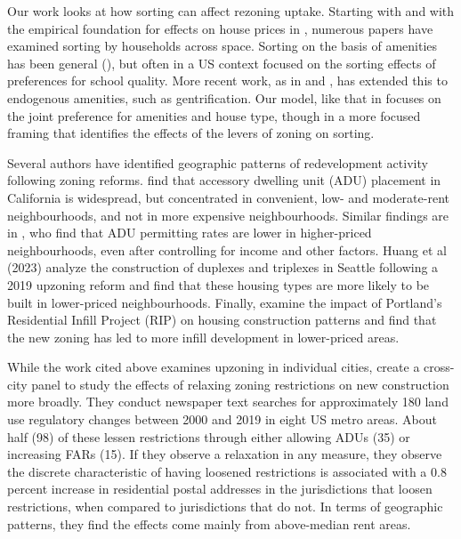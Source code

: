 \documentclass[12pt]{article}
\begin{document}
Our work looks at how sorting can affect rezoning uptake. Starting with \textcite{Tiebout1956} and with the empirical foundation for effects on house prices in \textcite{Rosen1974}, numerous papers have examined sorting by households across space. Sorting on the basis of amenities has been general (\textcite{Bayer_etal2004}), but often in a US context focused on the sorting effects of preferences for school quality. More recent work, as in \textcite{Couture_etal2024} and \textcite{AlmagoDomingues2025}, has extended this to endogenous amenities, such as gentrification. Our model, like that in \textcite{BayerMcMillan2012} focuses on the joint preference for amenities and house type, though in a more focused framing that identifies the effects of the levers of zoning on sorting. 

Several authors have identified geographic patterns of redevelopment activity following zoning reforms. \textcite{MarantzElmendorfKim2023_ADUReforms} find that accessory dwelling unit (ADU) placement in California is widespread, but concentrated in convenient, low- and moderate-rent neighbourhoods, and not in more expensive neighbourhoods. Similar findings are in \textcite{BruecknerThomaz2024}, who find that ADU permitting rates are lower in higher-priced neighbourhoods, even after controlling for income and other factors. Huang et al (2023) analyze the construction of duplexes and triplexes in Seattle following a 2019 upzoning reform and find that these housing types are more likely to be built in lower-priced neighbourhoods. Finally, \textcite{DongHansz_2019} examine the impact of Portland's Residential Infill Project (RIP) on housing construction patterns and find that the new zoning has led to more infill development in lower-priced areas. 

While the work cited above examines upzoning in individual cities, \textcite{Stacy_etal2023} create a cross-city panel to study the effects of relaxing zoning restrictions on new construction more broadly. They conduct newspaper text searches for approximately 180 land use regulatory changes between 2000 and 2019 in eight US metro areas. About half (98) of these lessen restrictions through either allowing ADUs (35) or increasing FARs (15). If they observe a relaxation in any measure, they observe the discrete characteristic of having loosened restrictions is associated with a 0.8 percent increase in residential postal addresses in the jurisdictions that loosen restrictions, when compared to jurisdictions that do not. In terms of geographic patterns, they find the effects come mainly from above-median rent areas.
\end{document}
